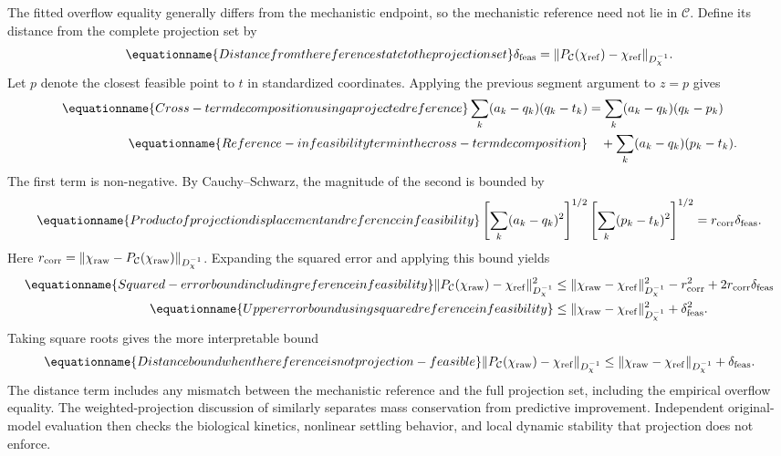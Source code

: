The fitted overflow equality generally differs from the mechanistic endpoint, so the mechanistic reference need not lie in $\mathcal C$. Define its distance from the complete projection set by
\begin{equation}
\equationname{Distance from the reference state to the projection set}
\delta_{\rm feas}=\|P_{\mathcal C}(\chi_{\rm ref})-\chi_{\rm ref}\|_{D_\chi^{-1}}.
\end{equation}
Let $p$ denote the closest feasible point to $t$ in standardized coordinates. Applying the previous segment argument to $z=p$ gives
\begin{align}
\equationname{Cross-term decomposition using a projected reference}
\sum_k(a_k-q_k)(q_k-t_k)
&=\sum_k(a_k-q_k)(q_k-p_k)\\
\equationname{Reference-infeasibility term in the cross-term decomposition}
&\quad+\sum_k(a_k-q_k)(p_k-t_k).
\end{align}
The first term is non-negative. By Cauchy--Schwarz, the magnitude of the second is bounded by
\begin{equation}
\equationname{Product of projection displacement and reference infeasibility}
\left[\sum_k(a_k-q_k)^2\right]^{1/2}
\left[\sum_k(p_k-t_k)^2\right]^{1/2}
=r_{\rm corr}\delta_{\rm feas}.
\end{equation}
Here $r_{\rm corr}=\|\chi_{\rm raw}-P_{\mathcal C}(\chi_{\rm raw})\|_{D_\chi^{-1}}$. Expanding the squared error and applying this bound yields
\begin{align}
\equationname{Squared-error bound including reference infeasibility}
\|P_{\mathcal C}(\chi_{\rm raw})-\chi_{\rm ref}\|_{D_\chi^{-1}}^2
&\le\|\chi_{\rm raw}-\chi_{\rm ref}\|_{D_\chi^{-1}}^2
-r_{\rm corr}^2+2r_{\rm corr}\delta_{\rm feas}\\
\equationname{Upper error bound using squared reference infeasibility}
&\le\|\chi_{\rm raw}-\chi_{\rm ref}\|_{D_\chi^{-1}}^2+\delta_{\rm feas}^2.
\end{align}
Taking square roots gives the more interpretable bound
\begin{equation}
\equationname{Distance bound when the reference is not projection-feasible}
\|P_{\mathcal C}(\chi_{\rm raw})-\chi_{\rm ref}\|_{D_\chi^{-1}}
\le\|\chi_{\rm raw}-\chi_{\rm ref}\|_{D_\chi^{-1}}+\delta_{\rm feas}.
\label{eq:plant_projection_error_general}
\end{equation}
The distance term includes any mismatch between the mechanistic reference and the full projection set, including the empirical overflow equality. The weighted-projection discussion of \citet{SturmSilva2024} similarly separates mass conservation from predictive improvement. Independent original-model evaluation then checks the biological kinetics, nonlinear settling behavior, and local dynamic stability that projection does not enforce.


